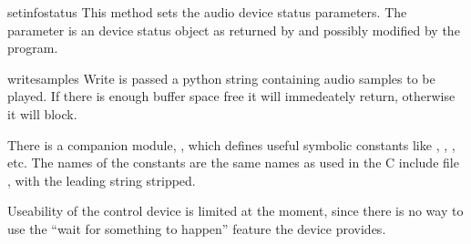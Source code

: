 \begin{funcdesc}{setinfo}{status}
This method sets the audio device status parameters. The 
parameter is an device status object as returned by  and
possibly modified by the program.
\end{funcdesc}

\begin{funcdesc}{write}{samples}
Write is passed a python string containing audio samples to be played.
If there is enough buffer space free it will immedeately return,
otherwise it will block.
\end{funcdesc}

There is a companion module, , which defines useful
symbolic constants like , ,
, etc. The names of
the constants are the same names as used in the C include file
, with the leading string  stripped.

Useability of the control device is limited at the moment, since there
is no way to use the ``wait for something to happen'' feature the
device provides.
